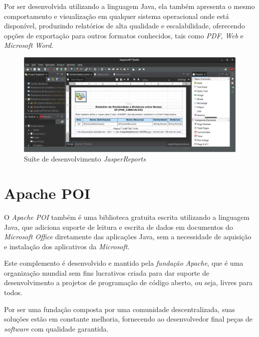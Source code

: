\documentclass[
	12pt,			%
	openright,		%
	oneside,	
	a4paper,		%
	english,		%
	brazil			%
]{abntex2/abntex2}  %
\begin{document}
			Por ser desenvolvida utilizando a linguagem Java, ela também apresenta o mesmo comportamento e visualização em qualquer sistema operacional onde está disponível, produzindo relatórios de alta qualidade e escalabilidade, oferecendo opções de exportação para outros formatos conhecidos, tais como \textit{PDF}, \textit{Web} e \textit{Microsoft Word}.
			
			\begin{figure}[h]
				\begin{center}
				
				
				\caption{Suíte de desenvolvimento \textit{JasperReports\textregistered}}
				\label{jasper-img}
				
				\includegraphics[scale=0.35]{img/jaspersoft}
				
				\end{center}
			\end{figure}

		\section{Apache POI} \label{apache-poi}
		
			O \textit{Apache POI} \cite{poi} também é uma biblioteca gratuita escrita utilizando a linguagem Java, que adiciona suporte de leitura e escrita de dados em documentos do \textit{Microsoft Office} diretamente das aplicações Java, sem a necessidade de aquisição e instalação dos aplicativos da \textit{Microsoft}.
			
			Este complemento é desenvolvido e mantido pela \textit{fundação Apache}, que é uma organização mundial sem fins lucrativos criada para dar suporte de desenvolvimento a projetos de programação de código aberto, ou seja, livres para todos.
			
			Por ser uma fundação composta por uma comunidade descentralizada, suas soluções estão em constante melhoria, fornecendo ao desenvolvedor final peças de \textit{software} com qualidade garantida.
\end{document}
